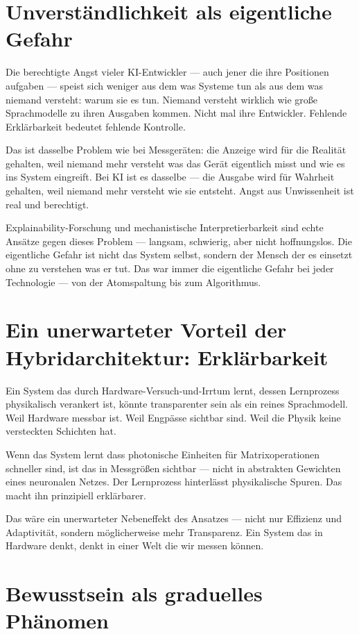 \documentclass[11pt]{report}
\begin{document}
\section{Unverständlichkeit als eigentliche Gefahr}

Die berechtigte Angst vieler KI-Entwickler --- auch jener die ihre Positionen aufgaben --- speist sich weniger aus dem was Systeme tun als aus dem was niemand versteht: warum sie es tun. Niemand versteht wirklich wie große Sprachmodelle zu ihren Ausgaben kommen. Nicht mal ihre Entwickler. Fehlende Erklärbarkeit bedeutet fehlende Kontrolle.

Das ist dasselbe Problem wie bei Messgeräten: die Anzeige wird für die Realität gehalten, weil niemand mehr versteht was das Gerät eigentlich misst und wie es ins System eingreift. Bei KI ist es dasselbe --- die Ausgabe wird für Wahrheit gehalten, weil niemand mehr versteht wie sie entsteht. Angst aus Unwissenheit ist real und berechtigt.

Explainability-Forschung und mechanistische Interpretierbarkeit sind echte Ansätze gegen dieses Problem --- langsam, schwierig, aber nicht hoffnungslos. Die eigentliche Gefahr ist nicht das System selbst, sondern der Mensch der es einsetzt ohne zu verstehen was er tut. Das war immer die eigentliche Gefahr bei jeder Technologie --- von der Atomspaltung bis zum Algorithmus.

\section{Ein unerwarteter Vorteil der Hybridarchitektur: Erklärbarkeit}

Ein System das durch Hardware-Versuch-und-Irrtum lernt, dessen Lernprozess physikalisch verankert ist, könnte transparenter sein als ein reines Sprachmodell. Weil Hardware messbar ist. Weil Engpässe sichtbar sind. Weil die Physik keine versteckten Schichten hat.

Wenn das System lernt dass photonische Einheiten für Matrixoperationen schneller sind, ist das in Messgrößen sichtbar --- nicht in abstrakten Gewichten eines neuronalen Netzes. Der Lernprozess hinterlässt physikalische Spuren. Das macht ihn prinzipiell erklärbarer.

Das wäre ein unerwarteter Nebeneffekt des Ansatzes --- nicht nur Effizienz und Adaptivität, sondern möglicherweise mehr Transparenz. Ein System das in Hardware denkt, denkt in einer Welt die wir messen können.

\section{Bewusstsein als graduelles Phänomen}
\end{document}
